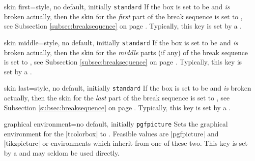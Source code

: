 

\begin{docTcbKey}{skin first}{=}{style, no default, initially \texttt{standard}}
  If the box is set to be  and \emph{is} broken actually,
  then the skin for the \emph{first} part of the break sequence
  is set to , see Subsection \ref{subsec:breaksequence} on page \pageref{subsec:breaksequence}.
  Typically, this key is set by a .
\end{docTcbKey}


\begin{docTcbKey}{skin middle}{=}{style, no default, initially \texttt{standard}}
  If the box is set to be  and \emph{is} broken actually,
  then the skin for the \emph{middle} parts (if any) of the break sequence
  is set to , see Subsection \ref{subsec:breaksequence} on page \pageref{subsec:breaksequence}.
  Typically, this key is set by a .
\end{docTcbKey}


\begin{docTcbKey}{skin last}{=}{style, no default, initially \texttt{standard}}
  If the box is set to be  and \emph{is} broken actually,
  then the skin for the \emph{last} part of the break sequence
  is set to , see Subsection \ref{subsec:breaksequence} on page \pageref{subsec:breaksequence}.
  Typically, this key is set by a .
\end{docTcbKey}


\begin{docTcbKey}{graphical environment}{=}{no default, initially \texttt{pgfpicture}}
  Sets the graphical environment for the |tcolorbox| to .
  Feasible values are |pgfpicture| and |tikzpicture| or environments which
  inherit from one of these two. This key is set by a  and
  may seldom be used directly.
\end{docTcbKey}

